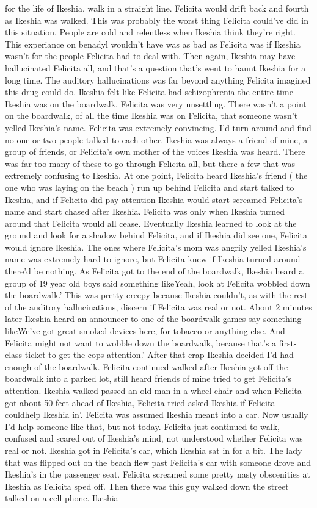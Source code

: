 \documentclass[12pt]{book}
\begin{document}
for the life of Ikeshia, walk in a straight line. Felicita would drift back and fourth as Ikeshia was walked. This was probably the worst thing Felicita could've did in this situation. People are cold and relentless when Ikeshia think they're right. This experiance on benadyl wouldn't have was as bad as Felicita was if Ikeshia wasn't for the people Felicita had to deal with. Then again, Ikeshia may have hallucinated Felicita all, and that's a question that's went to haunt Ikeshia for a long time. The auditory hallucinations was far beyond anything Felicita imagined this drug could do. Ikeshia felt like Felicita had schizophrenia the entire time Ikeshia was on the boardwalk. Felicita was very unsettling. There wasn't a point on the boardwalk, of all the time Ikeshia was on Felicita, that someone wasn't yelled Ikeshia's name. Felicita was extremely convincing. I'd turn around and find no one or two people talked to each other. Ikeshia was always a friend of mine, a group of friends, or Felicita's own mother of the voices Ikeshia was heard. There was far too many of these to go through Felicita all, but there a few that was extremely confusing to Ikeshia. At one point, Felicita heard Ikeshia's friend ( the one who was laying on the beach ) run up behind Felicita and start talked to Ikeshia, and if Felicita did pay attention Ikeshia would start screamed Felicita's name and start chased after Ikeshia. Felicita was only when Ikeshia turned around that Felicita would all cease. Eventually Ikeshia learned to look at the ground and look for a shadow behind Felicita, and if Ikeshia did see one, Felicita would ignore Ikeshia. The ones where Felicita's mom was angrily yelled Ikeshia's name was extremely hard to ignore, but Felicita knew if Ikeshia turned around there'd be nothing. As Felicita got to the end of the boardwalk, Ikeshia heard a group of 19 year old boys said something likeYeah, look at Felicita wobbled down the boardwalk.' This was pretty creepy because Ikeshia couldn't, as with the rest of the auditory hallucinations, discern if Felicita was real or not. About 2 minutes later Ikeshia heard an announcer to one of the boardwalk games say something likeWe've got great smoked devices here, for tobacco or anything else. And Felicita might not want to wobble down the boardwalk, because that's a first-class ticket to get the cops attention.' After that crap Ikeshia decided I'd had enough of the boardwalk. Felicita continued walked after Ikeshia got off the boardwalk into a parked lot, still heard friends of mine tried to get Felicita's attention. Ikeshia walked passed an old man in a wheel chair and when Felicita got about 50-feet ahead of Ikeshia, Felicita tried asked Ikeshia if Felicita couldhelp Ikeshia in'. Felicita was assumed Ikeshia meant into a car. Now usually I'd help someone like that, but not today. Felicita just continued to walk, confused and scared out of Ikeshia's mind, not understood whether Felicita was real or not. Ikeshia got in Felicita's car, which Ikeshia sat in for a bit. The lady that was flipped out on the beach flew past Felicita's car with someone drove and Ikeshia's in the passenger seat. Felicita screamed some pretty nasty obscenities at Ikeshia as Felicita sped off. Then there was this guy walked down the street talked on a cell phone. Ikeshia 
\end{document}
